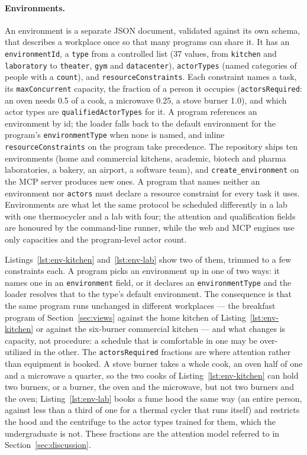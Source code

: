 \documentclass[10pt]{article}
\newcommand{\code}[1]{\texttt{#1}}
\begin{document}
\paragraph{Environments.}
\label{sec:environments}
An environment is a separate JSON document, validated against its own schema, that describes a workplace once so that many programs can share it. It has an \code{environmentId}, a \code{type} from a controlled list (37 values, from \code{kitchen} and \code{laboratory} to \code{theater}, \code{gym} and \code{datacenter}), \code{actorTypes} (named categories of people with a \code{count}), and \code{resourceConstraints}. Each constraint names a task, its \code{maxConcurrent} capacity, the fraction of a person it occupies (\code{actorsRequired}: an oven needs 0.5 of a cook, a microwave 0.25, a stove burner 1.0), and which actor types are \code{qualifiedActorTypes} for it. A program references an environment by id; the loader falls back to the default environment for the program's \code{environmentType} when none is named, and inline \code{resourceConstraints} on the program take precedence. The repository ships ten environments (home and commercial kitchens, academic, biotech and pharma laboratories, a bakery, an airport, a software team), and \code{create\_environment} on the MCP server produces new ones. A program that names neither an environment nor \code{actors} must declare a resource constraint for every task it uses. Environments are what let the same protocol be scheduled differently in a lab with one thermocycler and a lab with four; the attention and qualification fields are honoured by the command-line runner, while the web and MCP engines use only capacities and the program-level actor count.

Listings~\ref{lst:env-kitchen} and~\ref{lst:env-lab} show two of them, trimmed to a
few constraints each. A program picks an environment up in one of two ways: it names one
in an \code{environment} field, or it declares an \code{environmentType} and the loader
resolves that to the type's default environment. The consequence is that the same program
runs unchanged in different workplaces --- the breakfast program of
Section~\ref{sec:views} against the home kitchen of Listing~\ref{lst:env-kitchen} or
against the six-burner commercial kitchen --- and what changes is capacity, not procedure:
a schedule that is comfortable in one may be over-utilized in the other. The \code{actorsRequired} fractions are where attention rather
than equipment is booked. A stove burner takes a whole cook, an oven half of one and a
microwave a quarter, so the two cooks of Listing~\ref{lst:env-kitchen} can hold two
burners, or a burner, the oven and the microwave, but not two burners and the oven;
Listing~\ref{lst:env-lab} books a fume hood the same way (an entire person, against less
than a third of one for a thermal cycler that runs itself) and restricts the hood and the
centrifuge to the actor types trained for them, which the undergraduate is not. These
fractions are the attention model referred to in Section~\ref{sec:discussion}.
\end{document}
